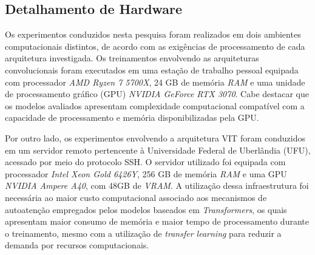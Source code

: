 \subsection*{Detalhamento de Hardware}

Os experimentos conduzidos nesta pesquisa foram realizados em dois ambientes computacionais distintos, de acordo com as exigências de processamento de cada arquitetura investigada. Os treinamentos envolvendo as arquiteturas convolucionais foram executados em uma estação de trabalho pessoal equipada com processador \textit{AMD Ryzen 7 5700X}, 24 GB de memória \textit{RAM} e uma unidade de processamento gráfico (GPU) \textit{NVIDIA GeForce RTX 3070}. Cabe destacar que os modelos avaliados apresentam complexidade computacional compatível com a capacidade de processamento e memória disponibilizadas pela GPU.

Por outro lado, os experimentos envolvendo a arquitetura \acs{VIT} foram conduzidos em um servidor remoto pertencente à Universidade Federal de Uberlândia (UFU), acessado por meio do protocolo SSH. O servidor utilizado foi equipada com processador \textit{Intel Xeon Gold 6426Y}, 256 GB de memória \textit{RAM} e uma GPU \textit{NVIDIA Ampere A40}, com 48GB de \textit{VRAM}. A utilização dessa infraestrutura foi necessária ao maior custo computacional associado aos mecanismos de autoatenção empregados pelos modelos baseados em \textit{Transformers}, os quais apresentam maior consumo de memória e maior tempo de processamento durante o treinamento, mesmo com a utilização de \textit{transfer learning} para reduzir a demanda por recursos computacionais.
